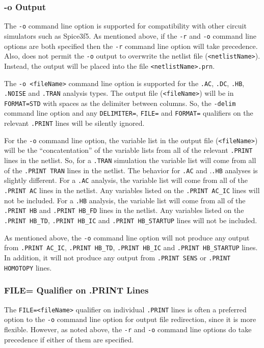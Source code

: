 \subsubsection{-o Output}
The \verb+-o+ command line option is supported for compatibility with other
circuit simulators such as Spice3f5.  As mentioned above, if the \verb+-r+ and 
\verb+-o+ command line options are both specified then the \verb+-r+ command 
line option will take precedence.  Also, \Xyce{} does not permit the \verb+-o+ output 
to overwrite the netlist file (\verb+<netlistName>+).  Instead, the output will 
be placed into the file \verb+<netlistName>.prn+. 

The \verb+-o <fileName>+ command line option is supported for the \texttt{.AC}, 
\texttt{.DC}, \texttt{.HB}, \texttt{.NOISE} and \texttt{.TRAN} analysis 
types.  The output file (\verb+<fileName>+) will be in \texttt{FORMAT=STD} with
spaces as the delimiter between columns.  So, the \verb+-delim+ command line 
option and any \texttt{DELIMITER=}, \texttt{FILE=} and \texttt{FORMAT=}
qualifiers on the relevant \texttt{.PRINT} lines will be silently ignored. 

For the \verb+-o+ command line option, the variable list in the output file 
(\verb+<fileName>+) will be the ``concatentation'' of the variable lists from
all of the relevant \texttt{.PRINT} lines in the netlist.  So, for a 
\texttt{.TRAN} simulation the variable list will come from all of the 
\texttt{.PRINT TRAN} lines in the netlist.  The behavior for \texttt{.AC} and 
.\texttt{.HB} analyses is slightly different.  For a \texttt{.AC} analysis, 
the variable list will come from all of the \texttt{.PRINT AC} lines in the 
netlist.  Any variables listed on the \texttt{.PRINT AC\_IC} lines will not 
be included.   For a \texttt{.HB} analysis, the variable list will come from 
all of the \texttt{.PRINT HB} and \texttt{.PRINT HB\_FD} lines in the netlist.  
Any variables listed on the \texttt{.PRINT HB\_TD}, \texttt{.PRINT HB\_IC} and
\texttt{.PRINT HB\_STARTUP} lines will not be included.

As mentioned above, the \verb+-o+ command line option will not produce 
any output from \texttt{.PRINT AC\_IC}, \texttt{.PRINT HB\_TD}, 
\texttt{.PRINT HB\_IC} and \texttt{.PRINT HB\_STARTUP} lines.  In addition,
it will not produce any output from \texttt{.PRINT SENS} or 
\texttt{.PRINT HOMOTOPY} lines.

\subsubsection{FILE= Qualifier on .PRINT Lines}
The \texttt{FILE=<fileName>} qualifier on individual \texttt{.PRINT} lines is
often a preferred option to the \verb+-o+ command line option for output file 
redirection, since it is more flexible.  However, as noted above, the \verb+-r+
 and \verb+-o+ command line options do take precedence if either of them are 
specified.

